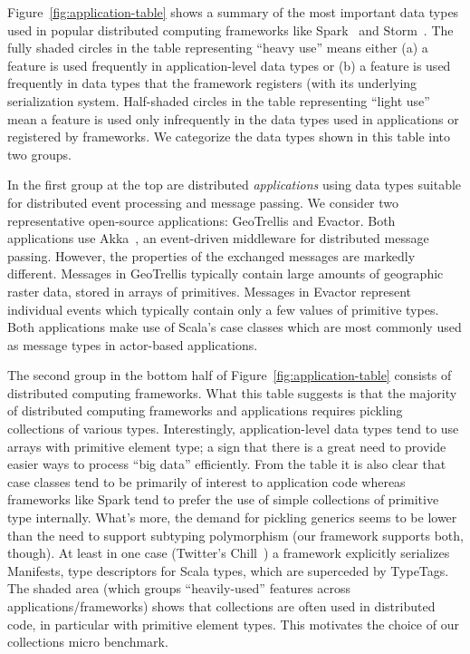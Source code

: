 \documentclass[10pt]{sigplanconf}
\theoremstyle{definition}
\theoremstyle{definition}
\begin{document}
Figure~\ref{fig:application-table} shows a summary of the most
important data types used in popular distributed computing frameworks
like Spark~\cite{Zaharia2012} and Storm~\cite{Storm}.
The fully shaded circles in the table representing ``heavy use'' means either
(a) a feature is used frequently in application-level data types or
(b) a feature is used frequently in data types that the framework registers
(with its underlying serialization system.
Half-shaded circles in the table representing ``light use'' mean a feature is used
only infrequently in the data types used in applications or registered by
frameworks. We categorize the data types shown in this table into two groups.

In the first group at the top are distributed \emph{applications}
using data types suitable for distributed event processing and message
passing. We consider two representative open-source applications: GeoTrellis
and Evactor. Both applications use Akka~\cite{Akka}, an
event-driven middleware for distributed message passing. However, the
properties of the exchanged messages are markedly different. Messages
in GeoTrellis typically contain large amounts of geographic raster
data, stored in arrays of primitives. Messages in Evactor represent
individual events which typically contain only a few values of
primitive types. Both applications make use of Scala's case classes
which are most commonly used as message types in actor-based
applications.

The second group in the bottom half of Figure~\ref{fig:application-table}
consists of distributed computing {frameworks}. What this table
suggests is that the majority of distributed computing frameworks and
applications requires pickling collections of various
types. Interestingly, application-level data types tend to use arrays
with primitive element type; a sign that there is a great need to
provide easier ways to process ``big data'' efficiently. From the
table it is also clear that case classes tend to be primarily of
interest to application code whereas frameworks like Spark tend to
prefer the use of simple collections of primitive type
internally. What's more, the demand for pickling generics seems to be
lower than the need to support subtyping polymorphism (our framework
supports both, though). At least in one case (Twitter's Chill~\cite{TwitterChill}) a
framework explicitly serializes Manifests, type descriptors for Scala
types, which are superceded by TypeTags.
The shaded area (which groups ``heavily-used'' features across
applications/frameworks) shows that collections are often used in distributed
code, in particular with primitive element types. This motivates the choice of
our collections micro benchmark.
\end{document}
